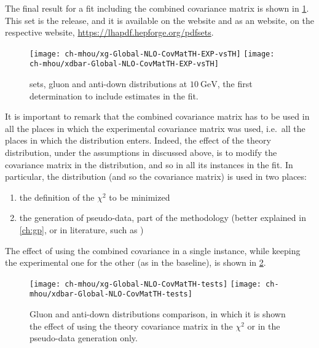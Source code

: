 The final result for a fit including the combined covariance matrix is shown in
\cref{fig:mhou/3.1th}.
%
This set is the  release, and it is available on the
\nnpdf website and as an \lhapdf website, on the respective website,
\url{https://lhapdf.hepforge.org/pdfsets}.

\begin{figure}
	\centering
	\texttt{[image: ch-mhou/xg-Global-NLO-CovMatTH-EXP-vsTH]}
	\texttt{[image: ch-mhou/xdbar-Global-NLO-CovMatTH-EXP-vsTH]}
	\caption{
		 \nlo sets, gluon and anti-down distributions at
		$\SI{10}{\giga\electronvolt}$, the first \pdf determination to include
		\mhou estimates in the fit.
	}
	\label{fig:mhou/3.1th}
\end{figure}

It is important to remark that the combined covariance matrix has to be used in
all the places in which the experimental covariance matrix was used, i.e.\ all
the places in which the distribution enters.
%
Indeed, the effect of the theory distribution, under the assumptions in
\cite{NNPDF:2019ubu} discussed above, is to modify the covariance matrix in the
distribution, and so in all its instances in the \pdf fit.
%
In particular, the distribution (and so the covariance matrix) is used in two
places:
\begin{enumerate}[label=\roman*.]
  \item the definition of the $\chi^2$ to be minimized
  \item the generation of pseudo-data, part of the \nnpdf methodology (better
    explained in \cref{ch:gp}, or in \nnpdf literature, such as
    \cite{Ball:2008by})
\end{enumerate}
%
The effect of using the combined covariance in a single instance, while keeping
the experimental one for the other (as in the baseline), is shown in
\cref{fig:mhou/3.1th-tests}.

\begin{figure}
	\centering
	\texttt{[image: ch-mhou/xg-Global-NLO-CovMatTH-tests]}
	\texttt{[image: ch-mhou/xdbar-Global-NLO-CovMatTH-tests]}
	\caption{
		Gluon and anti-down distributions comparison, in which it is shown the
		effect of using the theory covariance matrix in the $\chi^2$ or in the
		pseudo-data generation only.
	}
	\label{fig:mhou/3.1th-tests}
\end{figure}

